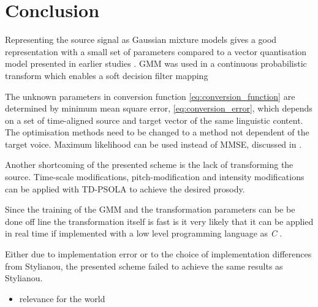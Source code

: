 \chapter{Conclusion} %
\label{cha:conclusion}
Representing the source signal as Gaussian mixture models gives a good representation with a small set of parameters compared to a vector quantisation model presented in earlier studies \cite{abe88}. GMM was used in a continuous probabilistic transform which enables a soft decision filter mapping


The unknown parameters in conversion function \eqref{eq:conversion_function} are determined by minimum mean square error, \eqref{eq:conversion_error}, which depends on a set of time-aligned source and target vector of the same linguistic content. The optimisation methods need to be changed to a method not dependent of the target voice. Maximum likelihood can be used instead of MMSE, discussed in \cite{mouchtaris06,ye06}.

Another shortcoming of the presented scheme is the lack of transforming the source. Time-scale modifications, pitch-modification and intensity modifications can be applied with \eg TD-PSOLA to achieve the desired prosody.

Since the training of the GMM and the transformation parameters can be be done off line the transformation itself is fast is it very likely that it can be applied in real time if implemented with a low level programming language as \emph{C} \cite{kernighan88}. 

Either due to implementation error or to the choice of implementation differences from Stylianou, the presented scheme failed to achieve the same results as Stylianou.

\begin{itemize}
	\item relevance for the world
\end{itemize}



